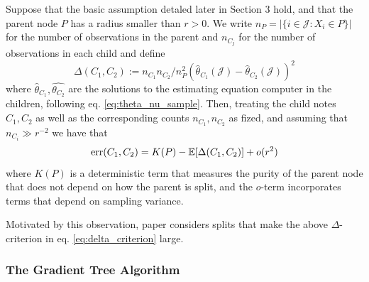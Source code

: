 \begin{prop}
\label{prop1}
	Suppose that the basic assumption detaled later in Section 3 hold, and that the parent node $P$ has a radius smaller than $r >0$. We write $n_P = |\{i \in \mathscr{J}: X_i \in P\}|$ for the number of observations in the parent and $n_{C_j}$ for the number of observations in each child and define 
	\begin{equation}
	\label{eq:delta_criterion}
		\Delta(C_1,C_2) := n_{C_1}n_{C_2}\big/n^2_P\left(\hat{\theta}_{C_1}(\mathscr{J}) - \hat{\theta}_{C_2}(\mathscr{J})\right)^2
	\end{equation}
	where $\hat{\theta}_{C_1}, \hat{\theta_{C_2}}$ are the solutions to the estimating equation computer in the children, following eq. \ref{eq:theta_nu_sample}. Then, treating the child notes $C_1,C_2$ as well as the corresponding counts $n_{C_1}, n_{C_2}$ as fized, and assuming that $n_{C_i} \gg r^{-2}$ we have that 
	\[\operatorname{err}(C_1,C_2) = K(P) - \mathbb{E}[\Delta(C_1,C_2)] + o(r^2)\]
	where $K(P)$ is a deterministic term that measures the purity of the parent node that does not depend on how the parent is split, and the $o$-term incorporates terms that depend on sampling variance. 
\end{prop}

Motivated by this observation, paper considers splits that make the above $\Delta$-criterion in eq. \ref{eq:delta_criterion} large.

\subsubsection{The Gradient Tree Algorithm}

